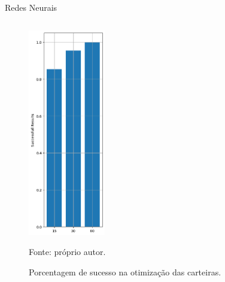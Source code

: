 \begin{frame}{Redes Neurais}
\begin{columns}
\begin{column}{0.5\textwidth}
                \begin{figure}[htbp]
                    \centering
                    \caption{Porcentagem de sucesso na otimização das carteiras.}
                    \label{fig:success_results}
                    \includegraphics[width=0.3\textwidth]{./images/success_results.png}
                    \par \footnotesize Fonte: próprio autor.
                \end{figure}

            \end{column}
        \end{columns}

    \end{frame}




